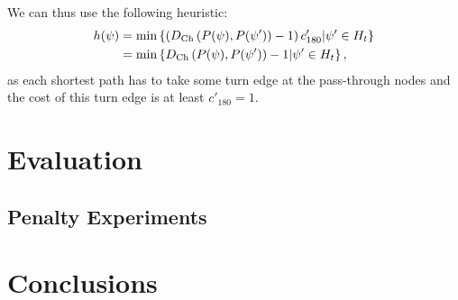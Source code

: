 \documentclass{sig-alternate-sigmod09}
\begin{document}
We can thus use the following heuristic:
%
\begin{align}
	h(\psi) &= \min\left\{ \left(D_{\text{Ch}}\left(P(\psi), P(\psi') \right) - 1\right) c'_{180}| \psi' \in H_t \right\}\\
	&= \min\left\{ D_{\text{Ch}}\left(P(\psi), P(\psi') \right) - 1 | \psi' \in H_t \right\},
\end{align}
%
as each shortest path has to take some turn edge at the pass-through nodes and the cost of this turn edge is at least $c'_{180} = 1$.

\section{Evaluation}

\subsection{Penalty Experiments}

\section{Conclusions}


\balancecolumns
\end{document}

